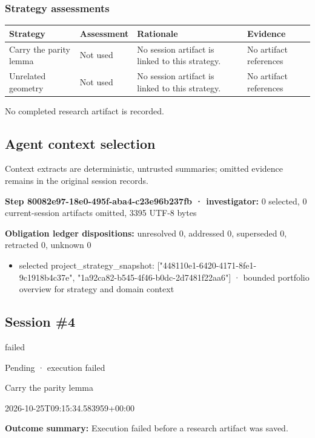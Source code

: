 \documentclass[11pt]{article}
\begin{document}
\subsubsection*{Strategy assessments}
\begin{longtable}{>{\raggedright\arraybackslash}p{.16\linewidth}>{\raggedright\arraybackslash}p{.15\linewidth}>{\raggedright\arraybackslash}p{.40\linewidth}>{\raggedright\arraybackslash}p{.17\linewidth}}
\toprule Strategy & Assessment & Rationale & Evidence \\
\midrule\endhead
Carry the parity lemma & Not used & No session artifact is linked to this strategy. & No artifact references \\
Unrelated geometry & Not used & No session artifact is linked to this strategy. & No artifact references \\
\bottomrule
\end{longtable}
No completed research artifact is recorded.\par
\subsection{Agent context selection}
Context extracts are deterministic, untrusted summaries; omitted evidence remains in the original session records.\par
\textbf{Step 80082e97-18e0-495f-aba4-c23e96b237fb · investigator:} 0 selected, 0 current-session artifacts omitted, 3395 UTF-8 bytes\par
\textbf{Obligation ledger dispositions:} unresolved 0, addressed 0, superseded 0, retracted 0, unknown 0\par
\begin{itemize}
\item selected project\_strategy\_snapshot: ["448110e1-6420-4171-8fe1-9c1918b4c37e", "1a92ca82-b545-4f46-b0dc-2d7481f22aa6"] · bounded portfolio overview for strategy and domain context
\end{itemize}
\subsection{Session \#4}
\begin{description}[style=nextline,font=\normalfont\bfseries,leftmargin=0pt,labelsep=0pt]
\item[Execution status] failed
\item[Outcome] Pending · execution failed
\item[Strategy] Carry the parity lemma
\item[Started] 2026-10-25T09:15:34.583959+00:00
\end{description}
\textbf{Outcome summary:} Execution failed before a research artifact was saved.\par
\end{document}
